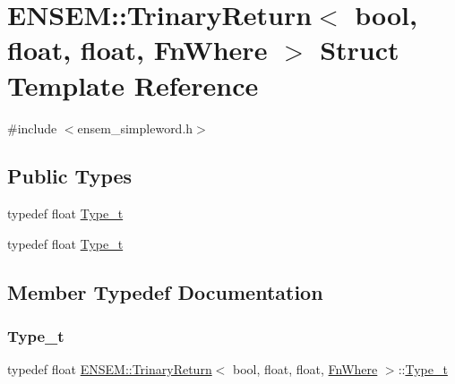 \hypertarget{structENSEM_1_1TrinaryReturn_3_01bool_00_01float_00_01float_00_01FnWhere_01_4}{}\section{E\+N\+S\+EM\+:\+:Trinary\+Return$<$ bool, float, float, Fn\+Where $>$ Struct Template Reference}
\label{structENSEM_1_1TrinaryReturn_3_01bool_00_01float_00_01float_00_01FnWhere_01_4}


{\ttfamily \#include $<$ensem\+\_\+simpleword.\+h$>$}

\subsection*{Public Types}
\begin{DoxyCompactItemize}
\item 
typedef float \mbox{\hyperlink{structENSEM_1_1TrinaryReturn_3_01bool_00_01float_00_01float_00_01FnWhere_01_4_a1e5c651d668076e9bbd52f373bc583bd}{Type\+\_\+t}}
\item 
typedef float \mbox{\hyperlink{structENSEM_1_1TrinaryReturn_3_01bool_00_01float_00_01float_00_01FnWhere_01_4_a1e5c651d668076e9bbd52f373bc583bd}{Type\+\_\+t}}
\end{DoxyCompactItemize}


\subsection{Member Typedef Documentation}
\mbox{\label{structENSEM_1_1TrinaryReturn_3_01bool_00_01float_00_01float_00_01FnWhere_01_4_a1e5c651d668076e9bbd52f373bc583bd}} 
\subsubsection{\texorpdfstring{Type\_t}{Type\_t}\hspace{0.1cm}{\footnotesize\ttfamily [1/2]}}
{\footnotesize\ttfamily typedef float \mbox{\hyperlink{structENSEM_1_1TrinaryReturn}{E\+N\+S\+E\+M\+::\+Trinary\+Return}}$<$ bool, float, float, \mbox{\hyperlink{structENSEM_1_1FnWhere}{Fn\+Where}} $>$\+::\mbox{\hyperlink{structENSEM_1_1TrinaryReturn_3_01bool_00_01float_00_01float_00_01FnWhere_01_4_a1e5c651d668076e9bbd52f373bc583bd}{Type\+\_\+t}}}


